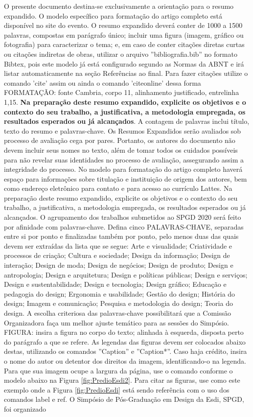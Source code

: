 \documentclass[a4paper,11pt,oneside,onecolumn,final]{article}
\begin{document}
O presente documento destina-se exclusivamente a orientação para o resumo expandido. O modelo específico para formatação do artigo completo está disponível no site do evento. O resumo expandido deverá conter de 1000 a 1500 palavras, compostas em parágrafo único; incluir uma figura (imagem, gráfico ou fotografia) para caracterizar o tema; e, em caso de conter citações diretas curtas ou citações indiretas de obras, utilizar o arquivo ''bibliografia.bib'' no formato Bibtex, pois este modelo já está configurado segundo as Normas da ABNT e irá listar automaticamente na seção Referências ao final. Para fazer citações utilize o comando 'cite' assim \cite{bonsiepe_design_2012} ou ainda o comando 'citeonline' dessa forma  FORMATAÇÃO: fonte Cambria, corpo 11, alinhamento justificado, entrelinha 1,15. \textbf{Na preparação deste resumo expandido, explicite os objetivos e o contexto do seu trabalho, a justificativa, a metodologia empregada, os resultados esperados ou já alcançados}. A contagem de palavras inclui título, texto do resumo e palavras-chave. Os Resumos Expandidos serão avaliados sob processo de avaliação cega por pares. Portanto, os autores do documento não devem incluir seus nomes no texto, além de tomar todos os cuidados possíveis para não revelar suas identidades no processo de avaliação, assegurando assim a integridade do processo. No modelo para formatação do artigo completo haverá espaço para informações sobre titulação e instituição de origem dos autores, bem como endereço eletrônico para contato e para acesso ao currículo Lattes. Na preparação deste resumo expandido, explicite os objetivos e o contexto do seu trabalho, a justificativa, a metodologia empregada, os resultados esperados ou já alcançados. O agrupamento dos trabalhos submetidos ao SPGD 2020 será feito por afinidade com palavras-chave. Defina cinco PALAVRAS-CHAVE, separadas entre si por ponto e finalizadas também por ponto, pelo menos duas das quais devem ser extraídas da lista que se segue: Arte e visualidade; Criatividade e processos de criação; Cultura e sociedade; Design da informação; Design de interação; Design de moda; Design de negócios; Design de produto; Design e antropologia; Design e arquitetura; Design e políticas públicas; Design e serviços; Design e sustentabilidade; Design e tecnologia; Design gráfico; Educação e pedagogia do design; Ergonomia e usabilidade; Gestão do design; História do design; Imagem e comunicação; Pesquisa e metodologia do design; Teoria do design. A escolha criteriosa das palavras-chave possibilitará que a Comissão Organizadora faça um melhor ajuste temático para as sessões do Simpósio.  FIGURA: insira a figura no corpo do texto; alinhada à esquerda, disposta perto do parágrafo a que se refere. As legendas das figuras devem ser colocados abaixo destas, utilizando os comandos ''Caption{}'' e ''Caption*{}''. Caso haja crédito, insira o nome do autor ou detentor dos direitos da imagem, identificando-o na legenda. Para que sua imagem ocupe a largura da página, use o comando conforme o modelo abaixo na Figura \ref{fig:PredioEsdi2}. Para citar as figuras, use como este exemplo onde a Figura \ref{fig:PredioEsdi} está sendo referência com o uso dos comandos label e ref. O Simpósio de Pós-Graduação em Design da Esdi, SPGD, foi organizado 
\end{document}
